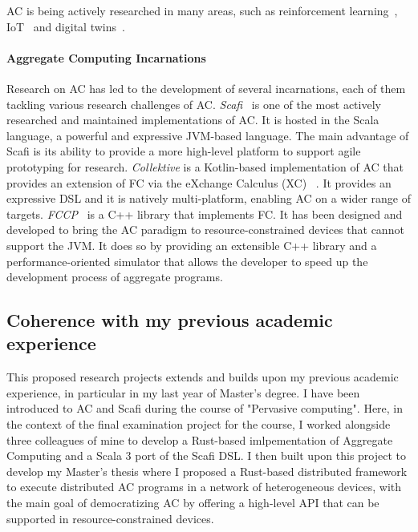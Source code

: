 \documentclass[12pt]{article}
\begin{document}
AC is being actively researched in many areas, such as reinforcement learning~\cite{aguzzi2022towards}, IoT~\cite{beal2015aggregate} and digital twins~\cite{casadei2021digital}.

\paragraph{\textbf{Aggregate Computing Incarnations}} Research on AC has led to the development of several incarnations, each of them tackling various research challenges of AC.
\textit{Scafi}~\cite{casadei2016towards} is one of the most actively researched and maintained implementations of
AC. It is hosted in the Scala language, a powerful and expressive JVM-based language. The main advantage of Scafi is its ability to provide a
more high-level platform to support agile prototyping for research. \textit{Collektive} is a Kotlin-based implementation of AC that provides an extension of FC via the eXchange Calculus (XC) ~\cite{audrito2024exchange}.
It provides an expressive DSL and it is natively multi-platform, enabling AC on a wider range of targets.
\textit{FCCP}~\cite{audrito2024fcpp} is a C++ library that implements FC. It has been designed and developed to bring the AC paradigm to
resource-constrained devices that cannot support the JVM. It does so by providing an extensible C++ library and a performance-oriented simulator that allows
the developer to speed up the development process of aggregate programs. 

\subsection{Coherence with my previous academic experience}
\label{sec:coherence}
This proposed research projects extends and builds upon my previous academic experience, in particular in my last year of Master's degree.
I have been introduced to AC and Scafi during the course of "Pervasive computing". Here, in the context of the final examination project for the course,
I worked alongside three colleagues of mine to develop a Rust-based imlpementation of Aggregate Computing and a Scala 3 port of the Scafi DSL.
I then built upon this project to develop my Master's thesis where I proposed a Rust-based distributed framework to execute distributed AC programs in a network of
heterogeneous devices, with the main goal of democratizing AC by offering a high-level API that can be supported in resource-constrained devices.

\end{document}
